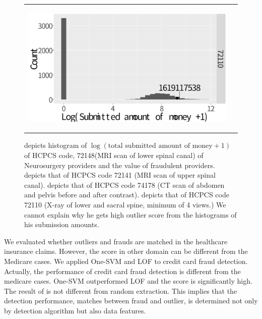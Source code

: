 \documentclass[dvipdfmx, english]{ampmt}             %
\begin{document}
\begin{figure}[H]
\begin{tabular}{cc}
\begin{minipage}{.5\hsize}
	\subcaption{}\label{fig:Diagnostic3}
      \end{minipage} 
       \begin{minipage}{.5\hsize}
        \centering
        \centerline{\includegraphics[scale=0.22]{../img/fraud/Diagnostic-Radiology-72110.pdf}}
	\subcaption{}\label{fig:Diagnostic4}
      \end{minipage} \\
    \end{tabular} 
   
     \caption{ depicts histogram of $\log (\mbox{total submitted amount of money} +1)$ of HCPCS code, 72148(MRI scan of lower spinal canal) of Neurosurgery providers and the value of fraudulent providers. 
      depicts that of HCPCS code 72141 (MRI scan of upper spinal canal). 
      depicts that of HCPCS code 74178 (CT scan of abdomen and pelvis before and after contrast).
      depicts that of HCPCS code 72110 (X-ray of lower and sacral spine, minimum of 4 views.) We cannot explain why he gets high outlier score from the histograms of his submission amounts.}
      \label{fig:Diagnostic}
\end{figure}
\par
We evaluated whether outliers and frauds are matched in the healthcare insurance claims. However, the score in other domain can be different from the Medicare cases. We applied One-SVM and LOF to credit card fraud detection.
Actually, the performance of credit card fraud detection is different from the medicare cases. One-SVM outperformed LOF and the score is significantly high. The result of is not different from random extraction. This implies that 
the detection performance, matches between fraud and outlier, is determined not only by detection algorithm but also data features.
\end{document}
